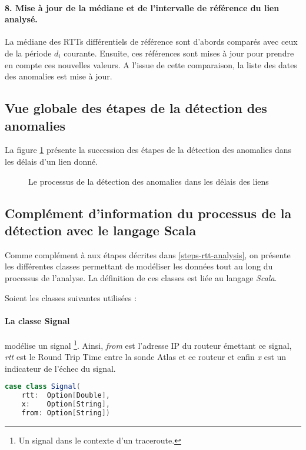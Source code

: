   \paragraph{8. Mise à jour de la médiane et de l'intervalle de  référence du lien analysé.} La médiane des RTTs différentiels de référence sont d'abords comparés avec ceux de la période $d_i$ courante. Ensuite, ces références sont mises à jour pour prendre en compte ces nouvelles valeurs. A l'issue de cette comparaison, la liste des dates des anomalies est mise à jour.
  


\subsection{Vue globale des étapes de la détection des anomalies}
La figure 	\ref{fig:process-rttanalysis_tex} présente la succession des étapes de la détection des anomalies dans les délais d'un lien donné. 

\begin{figure}[h]
	\centering
	\resizebox{\textwidth}{\textheight}{
		
	}
	\caption{Le processus de la détection des anomalies dans les délais des liens}
	\label{fig:process-rttanalysis_tex}
\end{figure}


\subsection{Complément d'information du processus de la détection avec le langage Scala}
Comme complément à aux étapes décrites dans \ref{steps-rtt-analysis}, on présente les différentes classes permettant de modéliser les données tout au long du processus de l'analyse. La définition de ces classes est liée au langage \textit{Scala}. 

Soient les classes suivantes utilisées : 

\paragraph{La classe Signal} modélise un signal \footnote{Un signal dans le contexte d'un traceroute.}. Ainsi, \textit{from} est l'adresse IP du routeur émettant ce signal, \textit{rtt} est le Round Trip Time entre la sonde Atlas et ce routeur et enfin \textit{x} est un indicateur de l'échec du signal.
\begin{lstlisting}[language=scala]
case class Signal(
	rtt:  Option[Double],
	x:    Option[String],
	from: Option[String])
\end{lstlisting}

